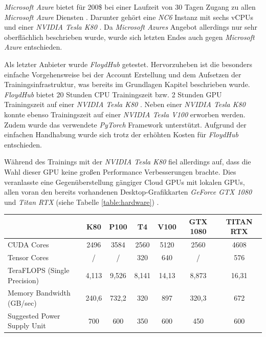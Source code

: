 \textit{Microsoft Azure} bietet für 200\$ bei einer Laufzeit von 30 Tagen Zugang zu allen \textit{Microsoft Azure} Diensten \cite{MicrosoftAzure.2020}. Darunter gehört eine \textit{NC6} Instanz mit sechs vCPUs und einer \textit{NVIDIA Tesla K80} \cite{MicrosoftAzure.202003124}. Da \textit{Microsoft Azures} Angebot allerdings nur sehr oberflächlich beschrieben wurde, wurde sich letzten Endes auch gegen \textit{Microsoft Azure} entschieden. 

Als letzter Anbieter wurde \textit{FloydHub} getestet. Hervorzuheben ist die besonders einfache Vorgehensweise bei der Account Erstellung und dem Aufsetzen der Trainingsinfrastruktur, was bereits im Grundlagen Kapitel beschrieben wurde. \textit{FloydHub} bietet 20 Stunden CPU Trainingszeit bzw. 2 Stunden GPU Trainingszeit auf einer \textit{NVIDIA Tesla K80} \cite{FloydHub.2020}. Neben einer \textit{NVIDIA Tesla K80} konnte ebenso Trainingszeit auf einer \textit{NVIDIA Tesla V100} erworben werden. Zudem wurde das verwendete \textit{PyTorch} Framework unterstützt. Aufgrund der einfachen Handhabung wurde sich trotz der erhöhten Kosten für \textit{FloydHub} entschieden. 

Während des Trainings mit der \textit{NVIDIA Tesla K80} fiel allerdings auf, dass die Wahl dieser GPU keine großen Performance Verbesserungen brachte. Dies veranlasste eine Gegenüberstellung gängiger Cloud GPUs mit lokalen GPUs, allen voran den bereits vorhandenen Desktop-Grafikkarten \textit{GeForce GTX 1080} und \textit{Titan RTX} (siehe Tabelle \ref{table:hardware}) \cite{TechPowerUp.20200209}.

\begin{center}
	\begin{tabular}[h]{l|c|c|c|c|c|c}
		& K80 & P100 & T4 & V100 & GTX 1080 & TITAN RTX \\
		\hline
		CUDA Cores & 2496 & 3584 & 2560 & 5120 & 2560 & 4608 \\
		Tensor Cores & / & / & 320 & 640 & / & 576 \\
		TeraFLOPS (Single Precision) & 4,113 & 9,526 & 8,141 & 14,13 & 8,873 & 16,31 \\
		Memory Bandwidth (GB/sec) & 240,6 & 732,2 & 320 & 897 & 320,3 & 672 \\
		Suggested Power Supply Unit & 700 & 600 & 350 & 600 & 450 & 600
	\end{tabular}
	\label{table:hardware}
\end{center}


